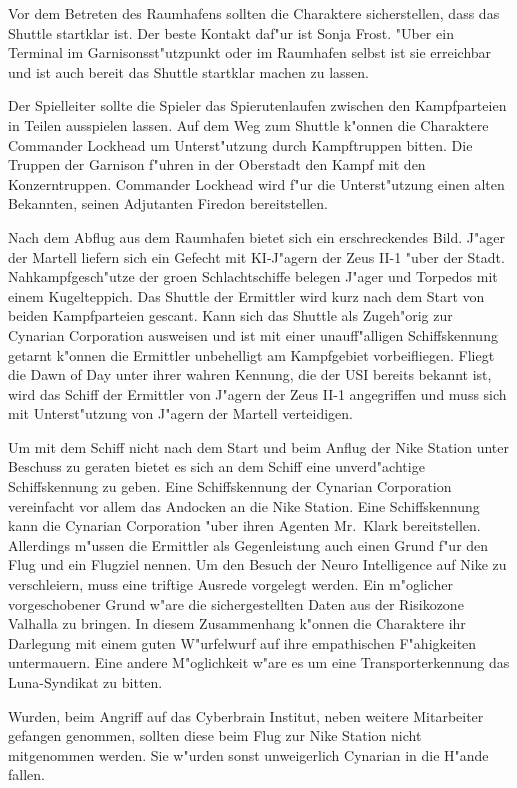 Vor dem Betreten des Raumhafens sollten die Charaktere sicherstellen, dass das Shuttle startklar ist. Der beste Kontakt daf"ur ist Sonja Frost. "Uber ein Terminal im Garnisonsst"utzpunkt oder im Raumhafen selbst ist sie erreichbar und ist auch bereit das Shuttle startklar machen zu lassen.

Der Spielleiter sollte die Spieler das Spie\3rutenlaufen zwischen den Kampfparteien in Teilen ausspielen lassen. Auf  dem Weg zum Shuttle k"onnen die Charaktere Commander Lockhead um Unterst"utzung durch Kampftruppen bitten. Die Truppen der Garnison f"uhren in der Oberstadt den Kampf mit den Konzerntruppen. Commander Lockhead wird f"ur die Unterst"utzung einen alten Bekannten, seinen Adjutanten Firedon bereitstellen.

Nach dem Abflug aus dem Raumhafen bietet sich ein erschreckendes Bild. J"ager der Martell liefern sich ein Gefecht mit KI-J"agern der Zeus II-1 "uber der Stadt. Nahkampfgesch"utze der gro\3en Schlachtschiffe belegen J"ager und Torpedos mit einem Kugelteppich. Das Shuttle der Ermittler wird kurz nach dem Start von beiden Kampfparteien gescant. Kann sich das 
Shuttle als Zugeh"orig zur Cynarian Corporation ausweisen und ist mit einer unauff"alligen Schiffskennung getarnt k"onnen 
die Ermittler unbehelligt am Kampfgebiet vorbeifliegen. Fliegt die Dawn of Day unter ihrer wahren Kennung, die der USI bereits bekannt ist, wird das Schiff der Ermittler von J"agern der Zeus II-1 angegriffen und muss sich mit Unterst"utzung von J"agern der Martell verteidigen.

Um mit dem Schiff nicht nach dem Start und beim Anflug der Nike Station unter Beschuss zu geraten bietet es sich an dem Schiff eine unverd"achtige Schiffskennung zu geben. Eine Schiffskennung der Cynarian Corporation vereinfacht vor allem das Andocken an die Nike Station. Eine Schiffskennung kann die Cynarian Corporation "uber ihren Agenten Mr.~Klark bereitstellen. Allerdings m"ussen die Ermittler als Gegenleistung auch einen Grund f"ur den Flug und ein Flugziel nennen. Um den Besuch der Neuro Intelligence auf Nike zu verschleiern, muss eine triftige Ausrede vorgelegt werden. Ein m"oglicher vorgeschobener Grund w"are die sichergestellten Daten aus der Risikozone Valhalla zu bringen. In diesem Zusammenhang k"onnen die Charaktere ihr Darlegung mit einem guten W"urfelwurf auf ihre empathischen F"ahigkeiten untermauern. Eine andere M"oglichkeit w"are es um eine Transporterkennung das Luna-Syndikat zu bitten.

\begin{remarks}
    Wurden, beim Angriff auf das Cyberbrain Institut, neben \ml{} weitere Mitarbeiter gefangen genommen, sollten diese beim Flug zur Nike Station nicht mitgenommen werden. Sie w"urden sonst unweigerlich Cynarian in die H"ande fallen.
\end{remarks}